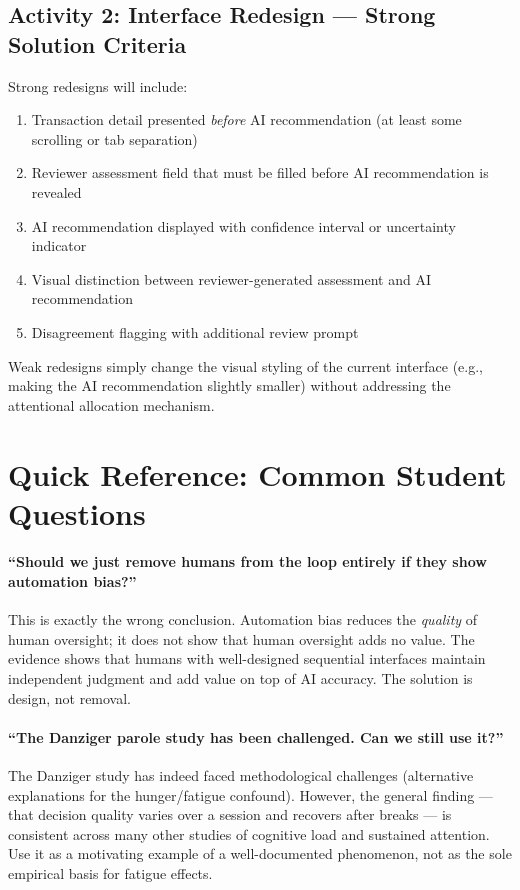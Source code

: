\subsection{Activity 2: Interface Redesign --- Strong Solution Criteria}

Strong redesigns will include:
\begin{enumerate}
    \item Transaction detail presented \emph{before} AI recommendation (at least some scrolling or tab separation)
    \item Reviewer assessment field that must be filled before AI recommendation is revealed
    \item AI recommendation displayed with confidence interval or uncertainty indicator
    \item Visual distinction between reviewer-generated assessment and AI recommendation
    \item Disagreement flagging with additional review prompt
\end{enumerate}

Weak redesigns simply change the visual styling of the current interface (e.g., making the AI recommendation slightly smaller) without addressing the attentional allocation mechanism.

\section{Quick Reference: Common Student Questions}

\paragraph{``Should we just remove humans from the loop entirely if they show automation bias?''}
This is exactly the wrong conclusion. Automation bias reduces the \emph{quality} of human oversight; it does not show that human oversight adds no value. The evidence shows that humans with well-designed sequential interfaces maintain independent judgment and add value on top of AI accuracy. The solution is design, not removal.

\paragraph{``The Danziger parole study has been challenged. Can we still use it?''}
The Danziger study has indeed faced methodological challenges (alternative explanations for the hunger/fatigue confound). However, the general finding --- that decision quality varies over a session and recovers after breaks --- is consistent across many other studies of cognitive load and sustained attention. Use it as a motivating example of a well-documented phenomenon, not as the sole empirical basis for fatigue effects.

